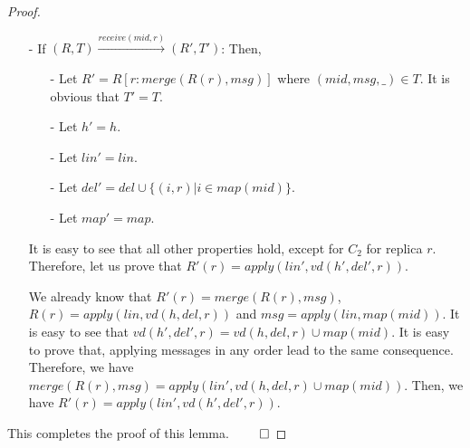 {\begin {proof}
\begin{itemize}
\begin{itemize}
    \item[-] Let $h' = h$.

    \item[-] Let $\mathit{lin}' = \mathit{lin}$.

    \item[-] Let $\mathit{del}' = \mathit{del}$.

    \item[-] Let $\mathit{map}' = \mathit{map} \cup \{ (\mathit{mid},\mathit{vd}(h,\mathit{del},r)) \}$.
    \end{itemize}

    It is easy to see that all other properties hold, except for checking $C_1$ for $\mathit{mid}$. This holds obviously since the message content of message $\mathit{mid}$ is $R(r)$, and we already know that $R(r) = \mathit{apply}(\mathit{lin},\mathit{vd}(h,\mathit{del},r)) = \mathit{apply}(\mathit{lin},\mathit{map}(\mathit{mid}))$.

\item[-] If $(R,T) {\xrightarrow{\mathit{receive}(\mathit{mid},r)}} (R',T')$: Then,

    \begin{itemize}
    \setlength{\itemsep}{0.5pt}
    \item[-] Let $R' = R[ r: \mathit{merge}(R(r),\mathit{msg})]$ where $(\mathit{mid},\mathit{msg},\_) \in T$. It is obvious that $T' = T$.

    \item[-] Let $h' = h$.

    \item[-] Let $\mathit{lin}' = \mathit{lin}$.

    \item[-] Let $\mathit{del}' = \mathit{del} \cup \{ (i,r) \vert i \in \mathit{map}(\mathit{mid}) \}$.

    \item[-] Let $\mathit{map}' = \mathit{map}$.
    \end{itemize}

    It is easy to see that all other properties hold, except for $C_2$ for replica $r$. Therefore, let us prove that $R'(r) = \mathit{apply}(\mathit{lin}',\mathit{vd}(h',\mathit{del}',r))$.

    We already know that $R'(r) = \mathit{merge}(R(r), \mathit{msg})$, $R(r) = \mathit{apply}(\mathit{lin},\mathit{vd}(h,\mathit{del},r))$ and $\mathit{msg} = \mathit{apply}(\mathit{lin},\mathit{map}(\mathit{mid}))$. It is easy to see that $\mathit{vd}(h',\mathit{del}',r) = \mathit{vd}(h,\mathit{del},r) \cup \mathit{map}(\mathit{mid})$. It is easy to prove that, applying messages in any order lead to the same consequence. Therefore, we have $\mathit{merge}(R(r), \mathit{msg}) = \mathit{apply}(\mathit{lin}',\mathit{vd}(h,\mathit{del},r) \cup \mathit{map}(\mathit{mid}))$. Then, we have $R'(r) = \mathit{apply}(\mathit{lin}',\mathit{vd}(h',\mathit{del}',r))$.
\end{itemize}

This completes the proof of this lemma. $\qed$
\end {proof}
}
